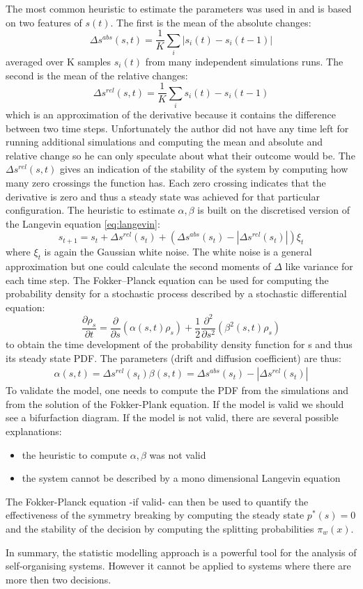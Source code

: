 The most common heuristic to estimate the parameters was
used in \citet{Hamann2010:AnalysisSimmetry} and is based on two features of $s(t)$.
The first is the mean of the absolute changes:
\begin{equation}
\varDelta s^{abs}(s,t)=\frac{1}{K}\sum_i | s_i(t)-s_i(t-1)|
\end{equation}
averaged over K samples $s_i(t)$ from many independent
simulations runs.
The second is the mean of the relative changes:
\begin{equation}
\varDelta s^{rel}(s,t)=\frac{1}{K}\sum_i  s_i(t)-s_i(t-1)
\end{equation}
which is an approximation of the derivative because
it contains the difference between two time steps.
Unfortunately the author did not have any time left for running
additional simulations and computing the mean and absolute
and relative change so he can only speculate about what their outcome would be.
The $\varDelta s^{rel}(s,t)$ gives an indication of the
stability of the system by computing how many zero crossings
the function has.
Each zero crossing indicates that the derivative is zero
and thus a steady state was achieved for that particular
configuration.
The heuristic to estimate $\alpha,\beta$ is built on the discretised
version of the Langevin equation \ref{eq:langevin}:
\begin{equation}
s_{t+1}=s_{t}+ \varDelta s^{rel}(s_t)+( \varDelta s^{abs}(s_t)-|\varDelta s^{rel}(s_t)|)\xi_t
\end{equation}
where $\xi_t$ is again the Gaussian white noise.
The white noise is a general approximation but one could calculate the second
moments of $\varDelta$ like variance for each time step.
The Fokker–Planck equation can be used for computing the probability density
for a stochastic process described by a stochastic differential equation:
\begin{equation}
\frac{\partial \rho_s}{\partial t}=\frac{\partial}{\partial s}(\alpha(s,t)\rho_s)+\frac{1}{2} \frac{\partial^2}{\partial s^2}(\beta^2(s,t)\rho_s)
\end{equation}
to obtain the time development of the probability density function for s and
thus its steady state PDF.
The parameters  (drift and diffusion coefficient) are thus:
\begin{align*}
\alpha(s,t)= \varDelta s^{rel}(s_t)
\beta(s,t)=\varDelta s^{abs}(s_t)-|\varDelta s^{rel}(s_t)|
\end{align*}
To validate the model, one needs to compute the PDF from the simulations
and from the solution of the Fokker-Plank equation.
If the model is valid we should see a bifurfaction diagram.
If the model is not valid, there are several possible explanations:
\begin{itemize}
 \item the heuristic to compute $\alpha,\beta$ was not valid
 \item the system cannot be described by a mono dimensional Langevin equation
\end{itemize}
The Fokker-Planck equation -if valid- can then be used to quantify
the effectiveness of the symmetry breaking by computing the steady state $p^*(s)=0$
and the stability of the decision by computing the splitting probabilities $\pi_w(x)$.

In summary, the statistic modelling approach is a powerful tool for the analysis
of self-organising systems.
However it cannot be applied to systems where there are more then
two decisions. 